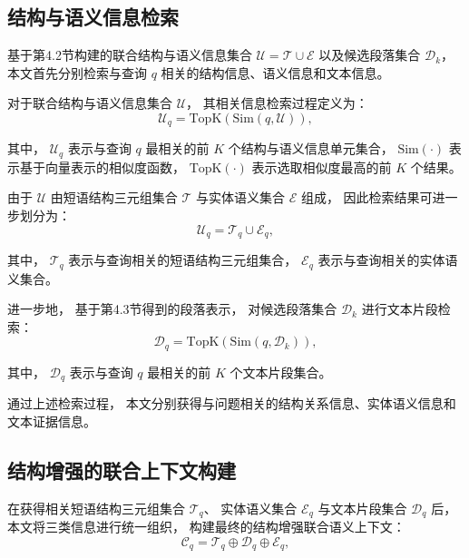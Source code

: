 \subsection{结构与语义信息检索}

基于第4.2节构建的联合结构与语义信息集合
$\mathcal{U}=\mathcal{T}\cup\mathcal{E}$
以及候选段落集合 $\mathcal{D}_k$，
本文首先分别检索与查询 $q$ 相关的结构信息、语义信息和文本信息。

对于联合结构与语义信息集合 $\mathcal{U}$，
其相关信息检索过程定义为：
\begin{equation}
\mathcal{U}_q = \text{TopK}(\text{Sim}(q,\mathcal{U})),
\end{equation}

\noindent 其中，
$\mathcal{U}_q$ 表示与查询 $q$ 最相关的前 $K$ 个结构与语义信息单元集合，
$\text{Sim}(\cdot)$ 表示基于向量表示的相似度函数，
$\text{TopK}(\cdot)$ 表示选取相似度最高的前 $K$ 个结果。

由于 $\mathcal{U}$ 由短语结构三元组集合 $\mathcal{T}$ 与实体语义集合 $\mathcal{E}$ 组成，
因此检索结果可进一步划分为：
\begin{equation}
\mathcal{U}_q=\mathcal{T}_q\cup\mathcal{E}_q,
\end{equation}

\noindent 其中，
$\mathcal{T}_q$ 表示与查询相关的短语结构三元组集合，
$\mathcal{E}_q$ 表示与查询相关的实体语义集合。

进一步地，
基于第4.3节得到的段落表示，
对候选段落集合 $\mathcal{D}_k$ 进行文本片段检索：
\begin{equation}
\mathcal{D}_q = \text{TopK}(\text{Sim}(q,\mathcal{D}_k)),
\end{equation}

\noindent 其中，
$\mathcal{D}_q$ 表示与查询 $q$ 最相关的前 $K$ 个文本片段集合。

通过上述检索过程，
本文分别获得与问题相关的结构关系信息、实体语义信息和文本证据信息。

\subsection{结构增强的联合上下文构建}

在获得相关短语结构三元组集合 $\mathcal{T}_q$、
实体语义集合 $\mathcal{E}_q$ 与文本片段集合 $\mathcal{D}_q$ 后，
本文将三类信息进行统一组织，
构建最终的结构增强联合语义上下文：
\begin{equation}
\mathcal{C}_q =
\mathcal{T}_q \oplus \mathcal{D}_q \oplus \mathcal{E}_q,
\end{equation}

